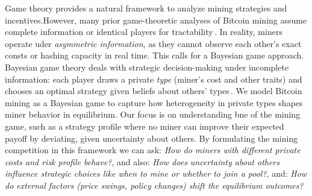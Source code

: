 \documentclass[12pt]{article}
\begin{document}
Game theory provides a natural framework to analyze mining strategies and incentives.However, many prior game-theoretic analyses of Bitcoin mining assume complete information or identical players for tractability\,\cite{kiayias2016blockchain}. In reality, miners operate uder \emph{asymmetric information}, as they cannot observe each other's exact consts or hashing capacity in real time. This calls for a Bayesian game approach. Bayesian game theory deals with strategic decision-making under incomplete information: each player draws a private \emph{type} (miner's cost and other traits) and chooses an optimal strategy given beliefs about others' types\,\cite{meirowitzpolitical}. We model Bitcoin mining as a Bayesian game to capture how heterogeneity in private types shapes miner behavior in equilibrium. Our focus is on understanding \gls{bne} of the mining game, such as a strategy profile where no miner can improve their expected payoff by deviating, given uncertainty about others. By formulating the mining competition in this framework we can ask: \emph{How do miners with different private costs and risk profile behave?}, and also: \emph{How does uncertainty about others influence strategic choices like when to mine or whether to join a pool?}, and: \emph{How do external factors (price swings, policy changes) shift the equilibrium outcomes?}



\end{document}
